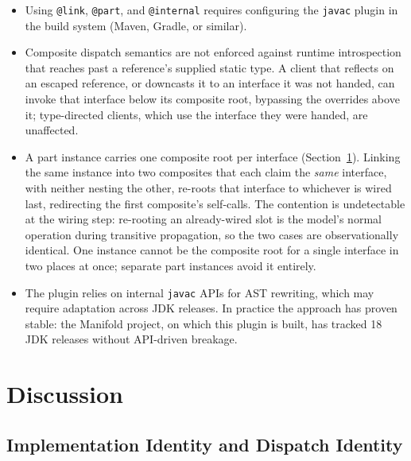 \documentclass[acmsmall,nonacm]{acmart}
\theoremstyle{acmplain}
\theoremstyle{acmdefinition}
\newcommand{\code}[1]{\texttt{#1}}
\begin{document}
\begin{itemize}
  \item Using \code{@link}, \code{@part}, and \code{@internal} requires
        configuring the \texttt{javac} plugin in the build system (Maven,
        Gradle, or similar).
  \item Composite dispatch semantics are not enforced against runtime
        introspection that reaches past a reference's supplied static type. A
        client that reflects on an escaped reference, or downcasts it to an
        interface it was not handed, can invoke that interface below its
        composite root, bypassing the overrides above it; type-directed
        clients, which use the interface they were handed, are unaffected.
  \item A part instance carries one composite root per interface
        (Section~\ref{sec:discussion}). Linking the same instance into two
        composites that each claim the \emph{same} interface, with neither
        nesting the other, re-roots that interface to whichever is wired last,
        redirecting the first composite's self-calls. The contention
        is undetectable at the wiring step: re-rooting an already-wired slot
        is the model's normal operation during transitive propagation, so the
        two cases are observationally identical. One instance cannot be the
        composite root for a single interface in two places at once; separate
        part instances avoid it entirely.
  \item The plugin relies on internal \texttt{javac} APIs for AST
        rewriting, which may require adaptation across JDK releases.
        In practice the approach has proven stable: the Manifold project,
        on which this plugin is built, has tracked 18 JDK releases
        without API-driven breakage.
\end{itemize}

\section{Discussion}
\label{sec:discussion}

\subsection{Implementation Identity and Dispatch Identity}
\end{document}
